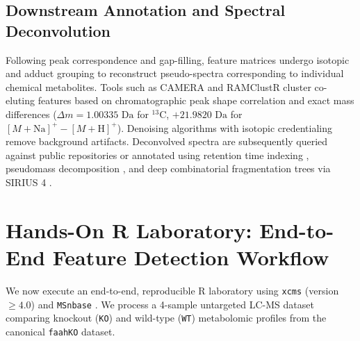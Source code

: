\documentclass[11pt,twoside,openright]{book}
\begin{document}
\subsection{Downstream Annotation and Spectral Deconvolution}

Following peak correspondence and gap-filling, feature matrices undergo isotopic and adduct grouping to reconstruct pseudo-spectra corresponding to individual chemical metabolites. Tools such as CAMERA \cite{kuhl2012camera} and RAMClustR \cite{broeckling2014ramclustr} cluster co-eluting features based on chromatographic peak shape correlation and exact mass differences ($\Delta m = 1.00335\text{ Da}$ for $^{13}\text{C}$, $+21.9820\text{ Da}$ for $[M+\text{Na}]^+ - [M+\text{H}]^+$). Denoising algorithms with isotopic credentialing \cite{huan2015denoising} remove background artifacts. Deconvolved spectra are subsequently queried against public repositories or annotated using retention time indexing \cite{domingo2018automated}, pseudomass decomposition \cite{stravs2013automatic}, and deep combinatorial fragmentation trees via SIRIUS 4 \cite{duhrkop2019sirius}.

\section{Hands-On R Laboratory: End-to-End Feature Detection Workflow}

We now execute an end-to-end, reproducible R laboratory using \texttt{xcms} (version $\ge 4.0$) and \texttt{MSnbase} \cite{gatto2012msnbase}. We process a 4-sample untargeted LC-MS dataset comparing knockout (\texttt{KO}) and wild-type (\texttt{WT}) metabolomic profiles from the canonical \texttt{faahKO} dataset.
\end{document}

